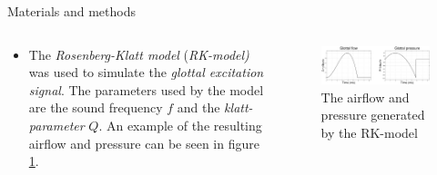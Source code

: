 \documentclass[final]{beamer}
\begin{document}
\begin{frame}[t]
\begin{columns}[t]
\begin{column}{.465\textwidth}

\begin{block}{Materials and methods}

\begin{columns} %
\begin{column}{.6\textwidth} %

\begin{itemize}

\item The \emph{Rosenberg-Klatt model} (\emph{RK-model)} \cite{rosenberg} was used to simulate the \emph{glottal excitation signal}. The parameters used by the model are the sound frequency $f$ and the \emph{klatt-parameter} $Q$. An example of the resulting airflow and pressure can be seen in figure \ref{fig:klatt}.

\end{itemize}

\end{column}

\begin{column}{.38\textwidth} %

\begin{figure}[t]
\begin{center}
\includegraphics[width=\linewidth]{klatt.eps}
\end{center}
\caption{The airflow and pressure generated by the RK-model}
\label{fig:klatt}
\end{figure}

\end{column}
\end{columns} %

\begin{itemize}


\end{itemize}
\end{block}
\end{column}
\end{columns}
\end{frame}
\end{document}
